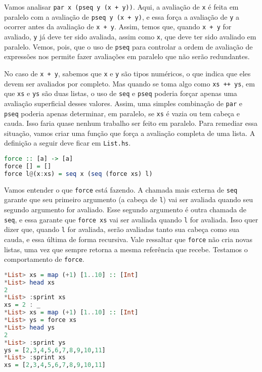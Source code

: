 \documentclass[a4paper]{article}
\begin{document}
Vamos analisar \texttt{par x (pseq y (x + y))}.
Aqui, a avaliação de \texttt{x} é feita em paralelo com a avaliação de \texttt{pseq y (x + y)}, e essa força a avaliação de \texttt{y} a ocorrer antes da avaliação de \mbox{\texttt{x + y}}.
Assim, temos que, quando \texttt{x + y} for avaliado, \texttt{y} já deve ter sido avaliada, assim como \texttt{x}, que deve ter sido avaliado em paralelo.
Vemos, pois, que o uso de \texttt{pseq} para controlar a ordem de avaliação de expressões nos permite fazer avaliações em paralelo que não serão redundantes.

No caso de \texttt{x + y}, sabemos que \texttt{x} e \texttt{y} são tipos numéricos, o que indica que eles devem ser avaliados por completo.
Mas quando se toma algo como \texttt{xs ++ ys}, em que \texttt{xs} e \texttt{ys} são duas listas, o uso de \texttt{seq} e \texttt{pseq} poderia forçar apenas uma avaliação superficial desses valores.
Assim, uma simples combinação de \texttt{par} e \texttt{pseq} poderia apenas determinar, em paralelo, se \texttt{xs} é vazia ou tem cabeça e cauda.
Isso faria quase nenhum trabalho ser feito em paralelo.
Para remediar essa situação, vamos criar uma função que força a avaliação completa de uma lista.
A definição a seguir deve ficar em \texttt{List.hs}.

\begin{lstlisting}[language=haskell, frame=single]
force :: [a] -> [a]
force [] = []
force l@(x:xs) = seq x (seq (force xs) l)
\end{lstlisting}

Vamos entender o que \texttt{force} está fazendo.
A chamada mais externa de \texttt{seq} garante que seu primeiro argumento (a cabeça de \texttt{l}) vai ser avaliada quando seu segundo argumento for avaliado.
Esse segundo argumento é outra chamada de \texttt{seq}, e essa garante que \texttt{force xs} vai ser avaliada quando \texttt{l} for avaliada.
Isso quer dizer que, quando \texttt{l} for avaliada, serão avaliadas tanto sua cabeça como sua cauda, e essa última de forma recursiva.
Vale ressaltar que \texttt{force} não cria novas listas, uma vez que sempre retorna a mesma referência que recebe.
Testamos o comportamento de \texttt{force}.

\begin{lstlisting}[language=haskell, frame=single]
*List> xs = map (+1) [1..10] :: [Int]
*List> head xs
2
*List> :sprint xs
xs = 2 : _
*List> xs = map (+1) [1..10] :: [Int]
*List> ys = force xs
*List> head ys
2
*List> :sprint ys
ys = [2,3,4,5,6,7,8,9,10,11]
*List> :sprint xs
xs = [2,3,4,5,6,7,8,9,10,11]
\end{lstlisting}
\end{document}
